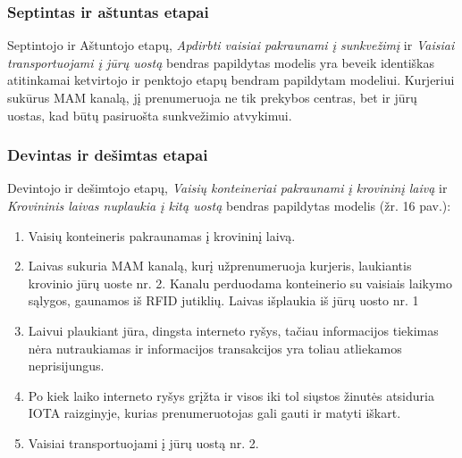 
\subsubsection{Septintas ir aštuntas etapai}

Septintojo ir Aštuntojo etapų, \textit{Apdirbti vaisiai pakraunami į sunkvežimį} ir \textit{Vaisiai transportuojami į jūrų uostą} bendras papildytas modelis yra beveik identiškas atitinkamai ketvirtojo ir penktojo etapų bendram papildytam modeliui. Kurjeriui sukūrus MAM kanalą, jį prenumeruoja ne tik prekybos centras, bet ir jūrų uostas, kad būtų pasiruošta sunkvežimio atvykimui.




\subsubsection{Devintas ir dešimtas etapai}

Devintojo ir dešimtojo etapų, \textit{Vaisių konteineriai pakraunami į krovininį laivą} ir \textit{Krovininis laivas nuplaukia į kitą uostą} bendras papildytas modelis (žr. 16 pav.):
\begin{enumerate}
    \item Vaisių konteineris pakraunamas į krovininį laivą.
    \item Laivas sukuria MAM kanalą, kurį užprenumeruoja kurjeris, laukiantis krovinio jūrų uoste nr. 2. Kanalu perduodama konteinerio su vaisiais laikymo sąlygos, gaunamos iš RFID jutiklių. Laivas išplaukia iš jūrų uosto nr. 1
    \item Laivui plaukiant jūra, dingsta interneto ryšys, tačiau informacijos tiekimas nėra nutraukiamas ir informacijos transakcijos yra toliau atliekamos neprisijungus. 
    \item Po kiek laiko interneto ryšys grįžta ir visos iki tol siųstos žinutės atsiduria IOTA raizginyje, kurias prenumeruotojas gali gauti ir matyti iškart.
    \item Vaisiai transportuojami į jūrų uostą nr. 2.
\end{enumerate}

